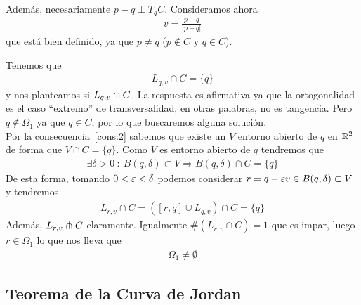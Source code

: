 Además, necesariamente $p-q \perp T_qC$. Consideramos ahora 
\begin{gather*}
    v = \frac{p-q}{|p-q|}
\end{gather*}
que está bien definido, ya que $p\neq q$ ($p\notin C$ y $q\in C$). 


Tenemos que 
\begin{gather*}
    L_{q,v} \cap C = \{q\}
\end{gather*}
y nos planteamos si $L_{q,v} \pitchfork C$. La respuesta es afirmativa ya que la ortogonalidad es el caso ``extremo'' de transversalidad, en otras palabras, no es tangencia. Pero $q\notin \Omega_1$ ya que $q\in C$, por lo que buscaremos alguna solución.\\

Por la consecuencia~\ref{cons:2} sabemos que existe un $V$ entorno abierto de $q$ en $\mathbb{R}^2$ de forma que $V\cap C = \{q\}$. Como $V$ es entorno abierto de $q$ tendremos que 
\begin{gather*}
    \exists \delta >0 \ : \ B(q, \delta)\subset V \Rightarrow B(q, \delta)\cap C = \{q\}
\end{gather*}
De esta forma, tomando $0<\varepsilon<\delta$ podemos considerar $r=q - \varepsilon v \in B(q, \delta)\subset V$ y tendremos
\begin{gather*}
    L_{r,v}\cap C = ([r,q]\cup L_{q,v})\cap C = \{q\}
\end{gather*}
Además, $L_{r,v}\pitchfork C$ claramente. Igualmente $\#(L_{r,v}\cap C)=1$
que es impar, luego $r\in \Omega_1$ lo que nos lleva que 
\begin{gather*}
    \boxed{\Omega_1 \neq \emptyset}
\end{gather*}

\subsection{Teorema de la Curva de Jordan}

